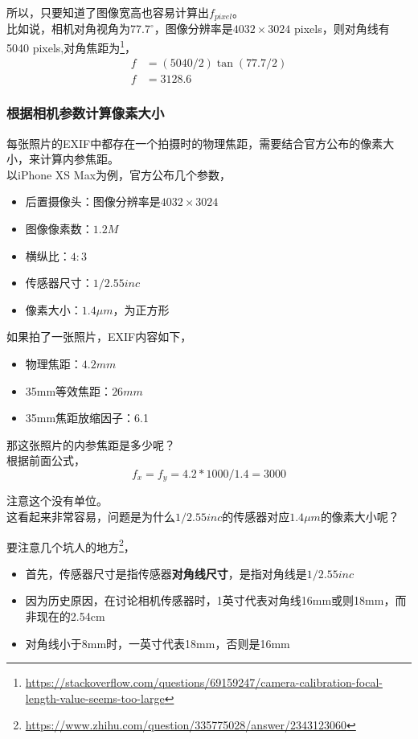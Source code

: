	所以，只要知道了图像宽高也容易计算出$f_{pixel}$。\\

	比如说，相机对角视角为$77.7^\circ$，图像分辨率是$4032 \times 3024$ pixels，则对角线有5040 pixels,对角焦距为\footnote{\url{https://stackoverflow.com/questions/69159247/camera-calibration-focal-length-value-seems-too-large}}，
	\begin{align*}
		f &= (5040/2)\tan(77.7/2)\\
		f &= 3128.6
	\end{align*}

\subsubsection*{根据相机参数计算像素大小}
	
	每张照片的EXIF中都存在一个拍摄时的物理焦距，需要结合官方公布的像素大小，来计算内参焦距。\\

	以iPhone XS Max为例，官方公布几个参数，
	\begin{itemize}
		\item 后置摄像头：图像分辨率是$4032 \times 3024$
		\item 图像像素数：$1.2M$
		\item 横纵比：$4 : 3$
		\item 传感器尺寸：$1/2.55inc$
		\item 像素大小：$1.4\mu m$，为正方形
	\end{itemize}

	如果拍了一张照片，EXIF内容如下，
	\begin{itemize}
		\item 物理焦距：$4.2mm$ 
		\item 35mm等效焦距：$26mm$
		\item 35mm焦距放缩因子：6.1
	\end{itemize}

	那这张照片的内参焦距是多少呢？\\

	根据前面公式，
	$$
		f_x = f_y = 4.2 * 1000/1.4 = 3000
	$$

	注意这个没有单位。\\

	这看起来非常容易，问题是为什么$1/2.55inc$的传感器对应$1.4\mu m$的像素大小呢？

	要注意几个坑人的地方\footnote{\url{https://www.zhihu.com/question/335775028/answer/2343123060}}，

	\begin{itemize}
		\item 首先，传感器尺寸是指传感器\textbf{对角线尺寸}，是指对角线是$1/2.55inc$
		\item 因为历史原因，在讨论相机传感器时，1英寸代表对角线16mm或则18mm，而非现在的2.54cm
		\item 对角线小于8mm时，一英寸代表18mm，否则是16mm
	\end{itemize}
	
